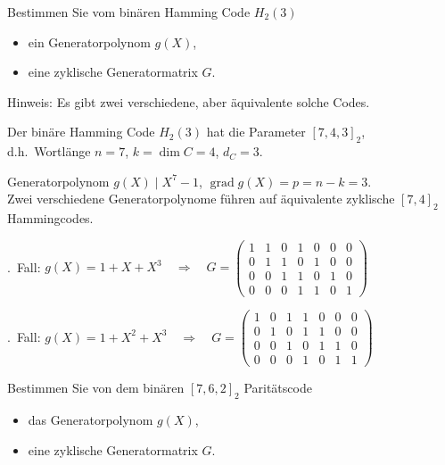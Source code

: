 \begin{aufgabe}[6\_2]
Bestimmen Sie vom binären Hamming Code $H_2(3)$
\begin{itemize}
  \item ein Generatorpolynom $g(X)$,
  \item eine zyklische Generatormatrix $G$.
\end{itemize}
Hinweis: Es gibt zwei verschiedene, aber äquivalente solche Codes.
\end{aufgabe}

\begin{loesung}
Der binäre Hamming Code $H_2(3)$ hat die Parameter $[7, 4, 3]_2$,\\
d.h.\ Wortlänge $n = 7$, $k = \dim C = 4$, $d_C = 3$.

Generatorpolynom $g(X) \mid X^7 - 1$, \quad $\operatorname{grad} g(X) = p = n - k = 3$.\\
Zwei verschiedene Generatorpolynome führen auf äquivalente zyklische $[7, 4]_2$ Hammingcodes.

.\ Fall: \quad $g(X) = 1 + X + X^3 \quad\Rightarrow\quad
G = \begin{pmatrix}
1 & 1 & 0 & 1 & 0 & 0 & 0\\
0 & 1 & 1 & 0 & 1 & 0 & 0\\
0 & 0 & 1 & 1 & 0 & 1 & 0\\
0 & 0 & 0 & 1 & 1 & 0 & 1
\end{pmatrix}$

.\ Fall: \quad $g(X) = 1 + X^2 + X^3 \quad\Rightarrow\quad
G = \begin{pmatrix}
1 & 0 & 1 & 1 & 0 & 0 & 0\\
0 & 1 & 0 & 1 & 1 & 0 & 0\\
0 & 0 & 1 & 0 & 1 & 1 & 0\\
0 & 0 & 0 & 1 & 0 & 1 & 1
\end{pmatrix}$
\end{loesung}

\begin{aufgabe}[6\_3]
Bestimmen Sie von dem binären $[7, 6, 2]_2$ Paritätscode
\begin{itemize}
  \item das Generatorpolynom $g(X)$,
  \item eine zyklische Generatormatrix $G$.
\end{itemize}
\end{aufgabe}

